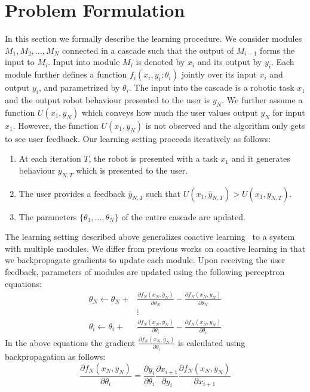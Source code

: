 \section{Problem Formulation}
In this section we formally describe the learning procedure. We consider modules $M_1,M_2,...,M_N$ connected in a cascade such that the output of $M_{i-1}$ forms the input to $M_i$. Input into  module $M_i$ is denoted by $x_i$ and its output by $y_i$. Each module further defines a function $f_i(x_i,y_i;\theta_i)$ jointly over its input $x_i$ and output $y_i$, and parametrized by $\theta_i$. The input into the cascade is a robotic task $x_1$ and the output robot behaviour presented to the user is $y_N$. 
We further assume a function $U(x_1,y_N)$ which conveys how much the user values output $y_N$ for input $x_1$. However, the function $U(x_1,y_N)$ is not observed and the algorithm only gets to see user feedback. Our learning setting proceeds iteratively as follows:
\begin{enumerate}
\item At each iteration $T$, the robot is presented with a task $x_1$ and it generates behaviour $y_{N,T}$ which is presented to the user.
\item The user provides a feedback $\bar{y}_{N,T}$ such that $U(x_1,\bar{y}_{N,T}) > U(x_1,{y}_{N,T})$.
\item The parameters $\{\theta_1,...,\theta_N\}$ of the entire cascade are updated.
\end{enumerate} 

The learning setting described above generalizes coactive learning~\citep{Jain13,Shivaswamy12} to a system with multiple modules. We differ from previous works on coactive learning in that we backpropagate gradients to update each module. Upon receiving the user feedback, parameters of modules are updated using the following perceptron equations:  
\begin{align}
\theta_N \leftarrow \theta_N +  &\frac{\partial f_N(x_N,\bar{y}_N)}{\partial \theta_N} - \frac{\partial f_N(x_N,{y}_N)}{\partial \theta_N}\\
 &\vdots\\
\theta_i \leftarrow \theta_i +  &\frac{\partial f_N(x_N,\bar{y}_N)}{\partial \theta_i} - \frac{\partial f_N(x_N,{y}_N)}{\partial \theta_i}
\end{align}
In the above equations the	 gradient $\frac{\partial f_N(x_N,\bar{y}_N)}{\partial \theta_i}$ is calculated using backpropagation as follows:
\begin{equation}
\frac{\partial f_N(x_N,\bar{y}_N)}{\partial \theta_i} = \frac{\partial y_i}{\partial \theta_i} \frac{\partial x_{i+1}}{\partial y_i} \frac{\partial f_N(x_N,\bar{y}_N)	}{\partial x_{i+1}}
\end{equation}   